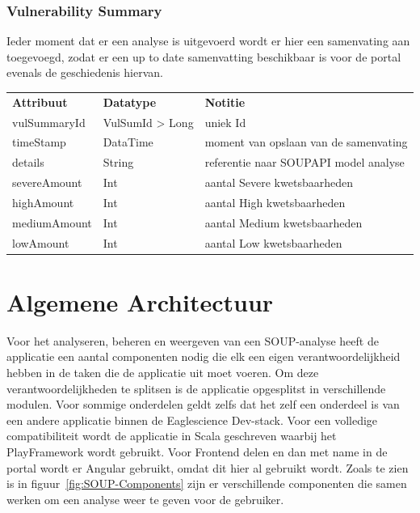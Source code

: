 \subsubsection{Vulnerability Summary}\label{subsubsec:portalVulSum}
Ieder moment dat er een analyse is uitgevoerd wordt er hier een samenvating aan toegevoegd, zodat er een up to date samenvatting beschikbaar is voor de portal evenals de geschiedenis hiervan.

\begin{tabular}{lll}
    \textbf{Attribuut} & \textbf{Datatype} & \textbf{Notitie}\\
    vulSummaryId & VulSumId > Long & uniek Id\\
    timeStamp & DataTime & moment van opslaan van de samenvating\\
    details & String & referentie naar SOUPAPI model analyse\\
    severeAmount & Int & aantal Severe kwetsbaarheden\\
    highAmount & Int & aantal High kwetsbaarheden\\
    mediumAmount & Int & aantal Medium kwetsbaarheden\\
    lowAmount & Int & aantal Low kwetsbaarheden\\
\end{tabular}

\section{Algemene Architectuur}\label{sec:algemene-architectuur}

Voor het analyseren, beheren en weergeven van een SOUP-analyse heeft de applicatie een aantal componenten nodig die elk een eigen verantwoordelijkheid hebben in de taken die de applicatie uit moet voeren. Om deze verantwoordelijkheden te splitsen is de applicatie opgesplitst in verschillende modulen. Voor sommige onderdelen geldt zelfs dat het zelf een onderdeel is van een andere applicatie binnen de Eaglescience Dev-stack. Voor een volledige compatibiliteit wordt de applicatie in Scala geschreven waarbij het PlayFramework wordt gebruikt. Voor Frontend delen en dan met name in de portal wordt er Angular gebruikt, omdat dit hier al gebruikt wordt. Zoals te zien is in figuur~\ref{fig:SOUP-Components} zijn er verschillende componenten die samen werken om een analyse weer te geven voor de gebruiker.

